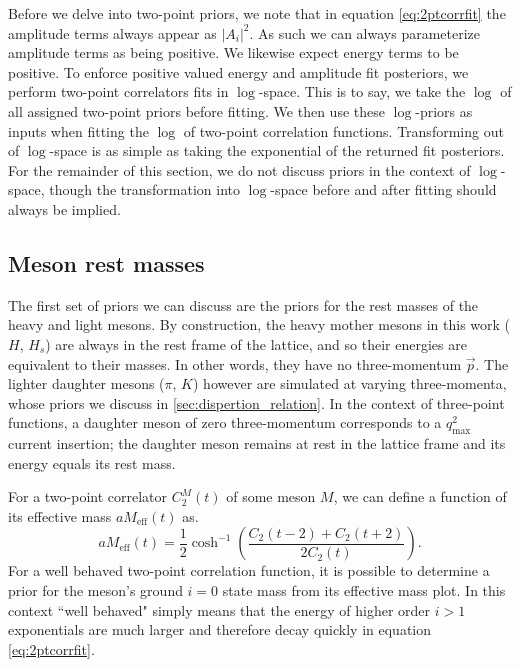 Before we delve into two-point priors, we note that in equation \ref{eq:2ptcorrfit} the amplitude terms always appear as $|A_i|^2$.  As such we can always parameterize amplitude terms as being positive.  We likewise expect energy terms to be positive.  To enforce positive valued energy and amplitude fit posteriors, we perform two-point correlators fits in $\log$-space.  This is to say, we take the $\log$ of all assigned two-point priors before fitting. We then use these $\log$-priors as inputs when fitting the $\log$ of two-point correlation functions. Transforming out of $\log$-space is as simple as taking the exponential of the returned fit posteriors.  For the remainder of this section, we do not discuss priors in the context of $\log$-space, though the transformation into $\log$-space before and after fitting should always be implied.




\subsection{Meson rest masses}\label{sec:meson_rest_masses}
The first set of priors we can discuss are the priors for the rest masses of the heavy and light mesons.  By construction, the heavy mother mesons in this work ($H$, $H_s$) are always in the rest frame of the lattice, and so their energies are equivalent to their masses.  In other words, they have no three-momentum $\vec{p}$.  The lighter daughter mesons ($\pi$, $K$) however are simulated at varying three-momenta, whose priors we discuss in \ref{sec:dispertion_relation}.  In the context of three-point functions, a daughter meson of zero three-momentum corresponds to a $q^2_{\text{max}}$ current insertion; the daughter meson remains at rest in the lattice frame and its energy equals its rest mass.

For a two-point correlator $C^M_2(t)$ of some meson $M$, we can define a function of its effective mass $aM_{\text{eff}}(t)$ as.  
\begin{equation} \label{eq:2ptam}
        aM_{\text{eff}}(t) = \frac{1}{2}\cosh^{-1}\left(\frac{C_2(t-2)+C_2(t+2)}{2C_2(t)}\right). 
\end{equation}
For a well behaved two-point correlation function, it is possible to determine a prior for the meson's ground $i=0$ state mass from its effective mass plot.  In this context ``well behaved" simply means that the energy of higher order $i>1$ exponentials are much larger and therefore decay quickly in equation \ref{eq:2ptcorrfit}.

